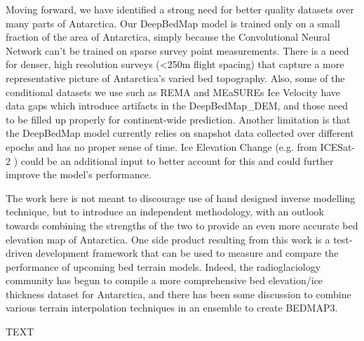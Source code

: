 \documentclass[tc, manuscript]{copernicus}
\begin{document}
Moving forward, we have identified a strong need for better quality datasets over many parts of Antarctica.
Our DeepBedMap model is trained only on a small fraction of the area of Antarctica, simply because the Convolutional Neural Network can't be trained on sparse survey point measurements.
There is a need for denser, high resolution surveys (<250m flight spacing) that capture a more representative picture of Antarctica's varied bed topography.
Also, some of the conditional datasets we use such as REMA \citep{HowatReferenceElevationModel2019} and MEaSUREs Ice Velocity \citep{RignotMEaSUREsInSARBasedAntarctica2017} have data gaps which introduce artifacts in the DeepBedMap\_DEM, and those need to be filled up properly for continent-wide prediction.
Another limitation is that the DeepBedMap model currently relies on snapshot data collected over different epochs and has no proper sense of time.
Ice Elevation Change (e.g. from ICESat-2 \citep{MarkusIceCloudland2017}) could be an additional input to better account for this and could further improve the model's performance.

The work here is not meant to discourage use of hand designed inverse modelling technique, but to introduce an independent methodology, with an outlook towards combining the strengths of the two to provide an even more accurate bed elevation map of Antarctica.
One side product resulting from this work is a test-driven development framework that can be used to measure and compare the performance of upcoming bed terrain models.
Indeed, the radioglaciology community has begun to compile a more comprehensive bed elevation/ice thickness dataset for Antarctica, and there has been some discussion to combine various terrain interpolation techniques in an ensemble to create BEDMAP3.

\conclusions  %
TEXT






\end{document}
